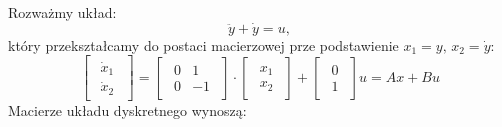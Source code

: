 \documentclass{article}
\begin{document}
        \begin{tcolorbox}[colback=green!5, colframe=green!75!black, title=Przykład]
        Rozważmy układ:
        $$
            \ddot{y} + \dot{y} = u,
        $$
        który przekształcamy do postaci macierzowej prze podstawienie $x_{1} = y,\,x_{2} = \dot{y}$:
        $$
            \begin{bmatrix}
            \begin{array}{c}
                \dot{x}_{1}\\
                \dot{x}_{2}
            \end{array}                
            \end{bmatrix}
            =
            \begin{bmatrix}
            \begin{array}{rr}
                0 & 1\\
                0 & -1
            \end{array}                
            \end{bmatrix}
            \cdot
            \begin{bmatrix}
            \begin{array}{c}
                x_{1}\\
                x_{2}
            \end{array}                
            \end{bmatrix}
            +
            \begin{bmatrix}
            \begin{array}{c}
                0\\
                1
            \end{array}                
            \end{bmatrix}
            u
            = Ax + Bu
        $$
        Macierze układu dyskretnego wynoszą:
\end{tcolorbox}
\end{document}
